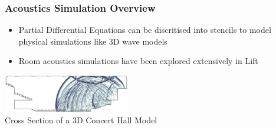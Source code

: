 \documentclass[10pt]{beamer}
\begin{document}
\begin{frame}
\frametitle{Acoustics Simulation Overview}
\vspace{.2cm}
\begin{itemize}
    \item Partial Differential Equations can be discritised into stencils to model physical simulations like 3D wave models 
    \item Room acoustics simulations have been explored extensively in Lift 
\end{itemize}
\vspace{-1.2cm}
        \begin{block}{}
            \begin{center}
            \vspace{.7cm}
            \begin{center} \includegraphics[width=5.5cm]{../images/crosssection.pdf}\\\caption{\footnotesize{Cross Section of a 3D Concert Hall Model}}\end{center}
        \end{center}
        \end{block}
\end{frame}


\appendix
\end{document}
